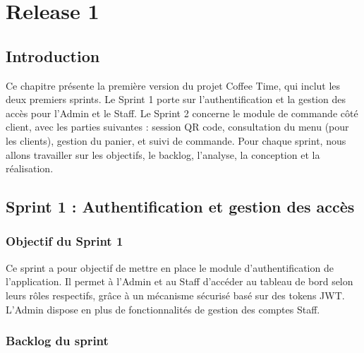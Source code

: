 \chapter{Release 1}

\section*{Introduction}

Ce chapitre présente la première version du projet Coffee Time, qui inclut les deux premiers sprints. Le Sprint 1 porte sur l'authentification et la gestion des accès pour l'Admin et le Staff. Le Sprint 2 concerne le module de commande côté client, avec les parties suivantes : session QR code, consultation du menu (pour les clients), gestion du panier, et suivi de commande. Pour chaque sprint, nous allons travailler sur les objectifs, le backlog, l'analyse, la conception et la réalisation.

\section{Sprint 1 : Authentification et gestion des accès}

\subsection{Objectif du Sprint 1}

Ce sprint a pour objectif de mettre en place le module d'authentification de l'application. Il permet à l'Admin et au Staff d'accéder au tableau de bord selon leurs rôles respectifs, grâce à un mécanisme sécurisé basé sur des tokens JWT. L'Admin dispose en plus de fonctionnalités de gestion des comptes Staff.

\subsection{Backlog du sprint}

